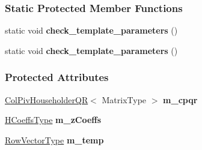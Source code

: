 \subsubsection*{Static Protected Member Functions}
\begin{DoxyCompactItemize}
\item 
\mbox{\label{group___q_r___module_a5e066e98d76f6bb2231f16676d18c877}} 
static void {\bfseries check\+\_\+template\+\_\+parameters} ()
\item 
\mbox{\label{group___q_r___module_a5e066e98d76f6bb2231f16676d18c877}} 
static void {\bfseries check\+\_\+template\+\_\+parameters} ()
\end{DoxyCompactItemize}
\subsubsection*{Protected Attributes}
\begin{DoxyCompactItemize}
\item 
\mbox{\label{group___q_r___module_af9254942a9a0930f6627c73b620e72a5}} 
\hyperlink{group___q_r___module_class_eigen_1_1_col_piv_householder_q_r}{Col\+Piv\+Householder\+QR}$<$ Matrix\+Type $>$ {\bfseries m\+\_\+cpqr}
\item 
\mbox{\label{group___q_r___module_a84daf778398c92d7c0856564069897b4}} 
\hyperlink{class_eigen_1_1internal_1_1_tensor_lazy_evaluator_writable}{H\+Coeffs\+Type} {\bfseries m\+\_\+z\+Coeffs}
\item 
\mbox{\label{group___q_r___module_a953bdfff5e3e3bdeeb3263b83eef4475}} 
\hyperlink{class_eigen_1_1internal_1_1_tensor_lazy_evaluator_writable}{Row\+Vector\+Type} {\bfseries m\+\_\+temp}
\end{DoxyCompactItemize}


